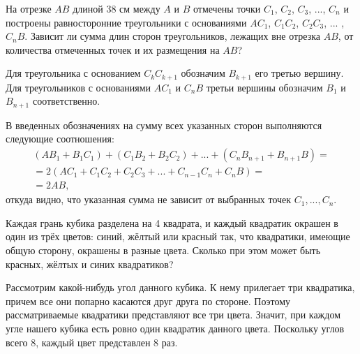 \begin{itemize}

\itB На отрезке $AB$ длиной 38 см между $A$ и $B$ отмечены точки $C_1$, $C_2$, $C_3$, ..., $C_n$ и построены равносторонние треугольники с основаниями $AC_1$, $C_1C_2$, $C_2C_3$, ... , $C_nB$. Зависит ли сумма длин сторон треугольников, лежащих вне отрезка $AB$, от количества отмеченных точек и их размещения на $AB$?

\itr Для треугольника с основанием $C_{k}C_{k+1}$ обозначим $B_{k+1}$ его третью вершину. Для треугольников с основаниями $AC_1$ и $C_nB$ третьи вершины обозначим $B_1$ и $B_{n+1}$ соответственно. 

\begin{center}\end{center}

В введенных обозначениях на сумму всех указанных сторон выполняются следующие соотношения:
$$
\begin{array}{l}
(AB_1+B_1C_1)+(C_1B_2+B_2C_2)+...+(C_nB_{n+1}+B_{n+1}B)=\\
=2(AC_1+C_1C_2+C_2C_3+...+C_{n-1}C_n+C_nB)=\\
=2AB,
\end{array}$$
откуда видно, что указанная сумма не зависит от выбранных точек $C_1,...,C_n$.


\itC Каждая грань кубика разделена на 4 квадрата, и каждый квадратик окрашен в один из трёх цветов: синий, жёлтый или красный так, что квадратики, имеющие общую сторону, окрашены в разные цвета. Сколько при этом может быть красных, жёлтых и синих квадратиков?

\itr Рассмотрим какой-нибудь угол данного кубика. К нему прилегает три квадратика, причем все они попарно касаются друг друга по стороне. Поэтому рассматриваемые квадратики представляют все три цвета. Значит, при каждом угле нашего кубика есть ровно один квадратик данного цвета. Поскольку углов всего 8, каждый цвет представлен 8 раз.

\end{itemize}
